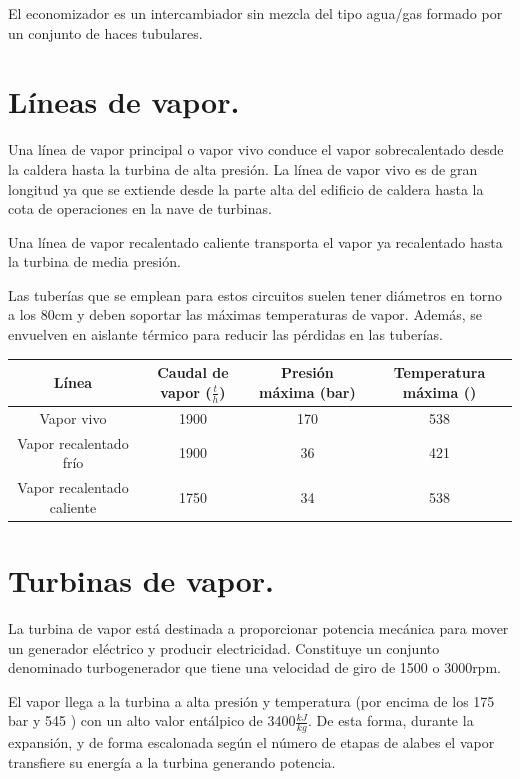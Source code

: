 El economizador es un intercambiador sin mezcla del tipo agua/gas formado por un conjunto de
haces tubulares.

\section{Líneas de vapor.}
Una línea de vapor principal o vapor vivo conduce el vapor sobrecalentado desde la caldera hasta la turbina
de alta presión. La línea de vapor vivo es de gran longitud ya que se extiende desde la parte alta del
edificio de caldera hasta la cota de operaciones en la nave de turbinas.



Una línea de vapor recalentado caliente transporta el vapor ya recalentado hasta la turbina de media presión.



Las tuberías que se emplean para estos circuitos suelen tener diámetros en torno a los 80cm y deben soportar las máximas temperaturas de vapor. Además, se envuelven en aislante térmico para reducir las pérdidas en las tuberías.

\begin{table}[H]
	\centering
	\renewcommand{\arraystretch}{1.5}
	\begin{tabular}{cccc}
		\hline
		Línea&Caudal de vapor ($\frac{t}{h}$)&Presión máxima (bar)&Temperatura máxima (\grado)\\
		\hline
		Vapor vivo&1900&170&538\\
		\hline
		Vapor recalentado frío&1900&36&421\\
		\hline
		Vapor recalentado caliente&1750&34&538\\
		\hline
	\end{tabular}
\end{table}
\section{Turbinas de vapor.}
La turbina de vapor está destinada a proporcionar potencia mecánica para
mover un generador eléctrico y producir electricidad. Constituye un conjunto denominado
turbogenerador que tiene una velocidad de giro de 1500 o 3000rpm.


El vapor llega a la turbina a alta presión y temperatura (por encima de los 175 bar y 545 \grado) con un alto valor entálpico de 3400$\frac{kJ}{kg}$. De esta forma, durante la expansión, y de forma escalonada según el número de etapas de alabes el vapor transfiere su energía a la turbina generando potencia. 



